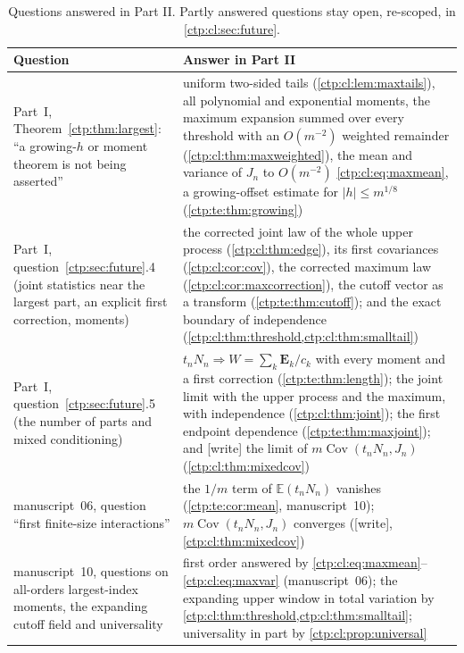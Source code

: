 \documentclass[11pt,a4paper]{article}
\numberwithin{equation}{section}
\theoremstyle{definition}
\theoremstyle{remark}
\newcommand{\E}{\mathbb E}
\DeclareMathOperator{\Cov}{Cov}
\begin{document}
\begin{table}[htbp]
\centering\small
\renewcommand{\arraystretch}{1.12}
\begin{tabular}{@{}>{\raggedright\arraybackslash}p{}>{\raggedright\arraybackslash}p{}@{}}
\toprule
Question & Answer in Part II\\
\midrule
Part~I, Theorem~\ref{ctp:thm:largest}: ``a growing-$h$ or moment theorem is
not being asserted'' &
uniform two-sided tails (\cref{ctp:cl:lem:maxtails}), all polynomial and
exponential moments, the maximum expansion summed over every threshold with
an $O(m^{-2})$ weighted remainder (\cref{ctp:cl:thm:maxweighted}), the
mean and variance of $J_n$ to $O(m^{-2})$ \eqref{ctp:cl:eq:maxmean}, a
growing-offset estimate for $|h|\le m^{1/8}$ (\cref{ctp:te:thm:growing})\\
Part~I, question~\ref{ctp:sec:future}.4 (joint statistics near the largest
part, an explicit first correction, moments) &
the corrected joint law of the whole upper process
(\cref{ctp:cl:thm:edge}), its first covariances
(\cref{ctp:cl:cor:cov}), the corrected maximum law
(\cref{ctp:cl:cor:maxcorrection}), the cutoff vector as a transform
(\cref{ctp:te:thm:cutoff}); and the exact boundary of independence
(\cref{ctp:cl:thm:threshold,ctp:cl:thm:smalltail})\\
Part~I, question~\ref{ctp:sec:future}.5 (the number of parts and mixed
conditioning) &
$t_nN_n\Rightarrow W=\sum_k\mathbf E_k/c_k$ with every moment and a first
correction (\cref{ctp:te:thm:length}); the joint limit with the upper
process and the maximum, with independence
(\cref{ctp:cl:thm:joint}); the first endpoint dependence
(\cref{ctp:te:thm:maxjoint}); and [write] the limit of
$m\Cov(t_nN_n,J_n)$ (\cref{ctp:cl:thm:mixedcov})\\
manuscript~06, question ``first finite-size interactions'' &
the $1/m$ term of $\E(t_nN_n)$ vanishes (\cref{ctp:te:cor:mean},
manuscript~10); $m\Cov(t_nN_n,J_n)$ converges ([write],
\cref{ctp:cl:thm:mixedcov})\\
manuscript~10, questions on all-orders largest-index moments, the
expanding cutoff field and universality &
first order answered by \eqref{ctp:cl:eq:maxmean}--\eqref{ctp:cl:eq:maxvar}
(manuscript~06); the expanding upper window in total variation by
\cref{ctp:cl:thm:threshold,ctp:cl:thm:smalltail}; universality in part by
\cref{ctp:cl:prop:universal}\\
\bottomrule
\end{tabular}
\caption{Questions answered in Part II. Partly answered questions stay
open, re-scoped, in \cref{ctp:cl:sec:future}.}
\label{ctp:cl:tab:answers}
\end{table}
\end{document}
